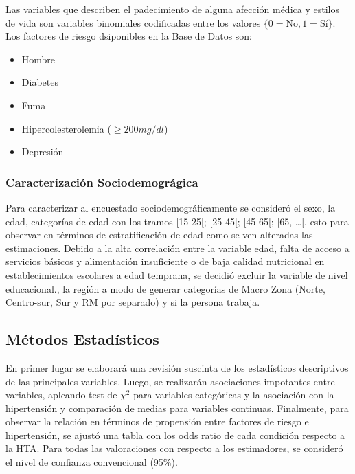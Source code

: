 \documentclass{aa}
\begin{document}
Las variables que describen el padecimiento de alguna afección médica y estilos de vida son variables binomiales codificadas entre los valores $\{0 = \textrm{No}, 1 = \textrm{Sí} \}$. Los factores de riesgo dsiponibles en la Base de Datos son:

\begin{itemize}
    \item Hombre
    \item      Diabetes
    \item      Fuma
         \item Hipercolesterolemia ($\geq 200 \textit{mg/dl} $)
         \item Depresión
\end{itemize}
        
 
\subsubsection{Caracterización Sociodemográgica}

Para caracterizar al encuestado sociodemográficamente se consideró el sexo, la edad, categorías de edad con los tramos [15-25[; [25-45[; [45-65[; [65, \dots [, esto para observar en términos de estratificación de edad como se ven alteradas las estimaciones. Debido a la alta correlación entre la variable edad, falta de acceso a servicios básicos y alimentación insuficiente o de baja calidad nutricional en establecimientos escolares a edad temprana, se decidió excluir la variable de nivel educacional., la región a modo de generar categorías de Macro Zona (Norte, Centro-sur, Sur y RM por separado) y si la persona trabaja.

\subsection{Métodos Estadísticos}

En primer lugar se elaborará una revisión suscinta de los estadísticos descriptivos de las principales variables. Luego, se realizarán asociaciones impotantes entre variables, aplcando test de $\chi^2$ para variables categóricas y la asociación con la hipertensión y comparación de medias para variables continuas. Finalmente, para observar la relación en términos de propensión entre factores de riesgo e hipertensión, se ajustó una tabla con los odds ratio de cada condición respecto a la HTA. Para todas las valoraciones con respecto a los estimadores, se consideró el nivel de confianza convencional (95\%).
\end{document}
